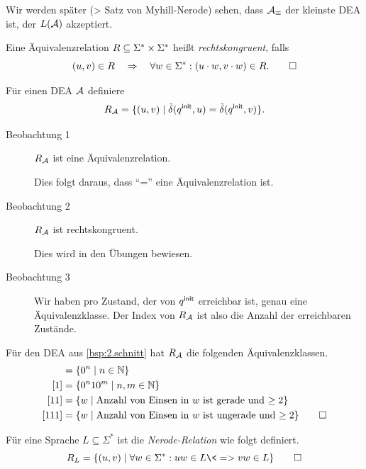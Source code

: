 Wir werden später (\-> Satz von Myhill-Nerode) sehen, dass $\mathcal{A}_\equiv$ der kleinste \acs*{DEA} ist, der $L(\mathcal{A})$ akzeptiert.

\begin{Def}[name={[Rechtskongruente Äquivalenzrelation]}]
        Eine Äquivalenzrelation $R\subseteq\Sigma^*\times\Sigma^*$ heißt \emph{rechtskongruent}, falls
        \[
        (u,v)\in R \quad\=>\quad \forall w\in\Sigma^*: (u\cdot w,v\cdot w) \in R.
        \qedhere
        \]
\end{Def}
\begin{Bsp} %
  \label{Bsp:R_m}
        Für einen \ac{DEA} $\mathcal{A}$ definiere
        \[ R_{\mathcal{A}} = \{(u,v) \mid \tilde\delta(q^\mathsf{init},u)=\tilde\delta(q^\mathsf{init},v)\}. \]
        \begin{description}
                \item[Beobachtung 1] $R_{\mathcal{A}}$ ist eine Äquivalenzrelation.
                
                Dies folgt daraus, dass "`="' eine Äquivalenzrelation ist.
                \item[Beobachtung 2] $R_{\mathcal{A}}$ ist rechtskongruent. 
                
                Dies wird in den Übungen bewiesen.
                \item[Beobachtung 3] Wir haben pro Zustand, der von $q^\mathsf{init}$ erreichbar ist, genau eine Äquivalenzklasse.
                Der Index von $R_{\mathcal{A}}$ ist also die Anzahl der erreichbaren Zustände.
        \end{description}
        
        \medskip
        
        Für den \ac{DEA} aus \autoref{bsp:2.schnitt} hat $R_{\mathcal{A}}$ die folgenden Äquivalenzklassen.
        \begin{align*}
        [\Eps] &= \{0^n\mid n\in \N\}\\
        [1] &= \{0^n10^m\mid n,m\in \N\}\\
        [11] &= \{w\mid \text{Anzahl von Einsen in $w$ ist gerade und $\geq 2$}\}\\
        [111] &= \{w\mid \text{Anzahl von Einsen in $w$ ist ungerade und $\geq 2$}\}
        \qedhere
        \end{align*}
\end{Bsp}
\begin{Def}
        Für eine Sprache $L\subseteq \Sigma^*$ ist die \emph{Nerode-Relation} wie folgt definiert.
        \[
        R_L = \{(u,v) \mid \forall w\in\Sigma^*: uw\in L \<=> vw\in L \}
        \qedhere
        \]
\end{Def}
